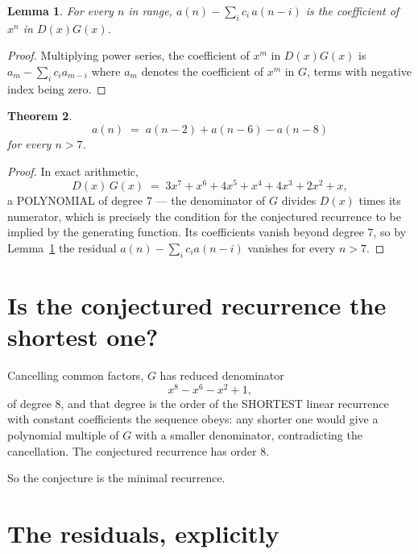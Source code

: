 \documentclass[11pt,a4paper]{article}
\theoremstyle{plain}
\newtheorem{theorem}{Theorem}
\newtheorem{lemma}[theorem]{Lemma}
\theoremstyle{definition}
\begin{document}
\begin{lemma}\label{lem:key}
For every $n$ in range, $a(n)-\sum_i c_i\,a(n-i)$ is the coefficient of $x^{n}$ in
$D(x)G(x)$.
\end{lemma}

\begin{proof}
Multiplying power series, the coefficient of $x^{m}$ in $D(x)G(x)$ is
$a_m-\sum_i c_i a_{m-i}$ where $a_m$ denotes the coefficient of $x^{m}$ in $G$, terms with
negative index being zero.
\end{proof}

\begin{theorem}
\[
a(n)\;=\;a(n-2) + a(n-6) - a(n-8)
\]
for every $n>7$.
\end{theorem}

\begin{proof}
In exact arithmetic,
\[
D(x)\,G(x)\;=\;3 x^{7} + x^{6} + 4 x^{5} + x^{4} + 4 x^{3} + 2 x^{2} + x,
\]
a POLYNOMIAL of degree $7$ --- the denominator of $G$ divides $D(x)$ times its numerator,
which is precisely the condition for the conjectured recurrence to be implied by the
generating function. Its coefficients vanish beyond degree $7$, so by
Lemma~\ref{lem:key} the residual $a(n)-\sum_ic_ia(n-i)$ vanishes for every
$n>7$.
\end{proof}

\section{Is the conjectured recurrence the shortest one?}

Cancelling common factors, $G$ has reduced denominator
\[
x^{8} - x^{6} - x^{2} + 1,
\]
of degree $8$, and that degree is the order of the SHORTEST linear recurrence with
constant coefficients the sequence obeys: any shorter one would give a polynomial multiple of
$G$ with a smaller denominator, contradicting the cancellation. The conjectured recurrence has
order $8$.

So the conjecture is the minimal recurrence.

\section{The residuals, explicitly}
\end{document}
